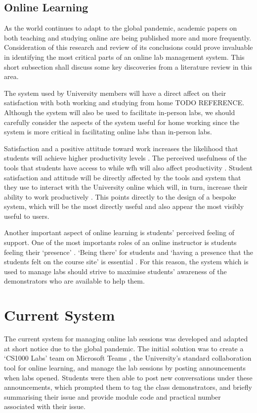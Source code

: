 \subsection{Online Learning}

As the world continues to adapt to the global pandemic, academic papers on both teaching and studying online are being published more and more frequently. Consideration of this research and review of its conclusions could prove invaluable in identifying the most critical parts of an online lab management system. This short subsection shall discuss some key discoveries from a literature review in this area.

The system used by University members will have a direct affect on their satisfaction with both working and studying from home TODO REFERENCE. Although the system will also be used to facilitate in-person labs, we should carefully consider the aspects of the system useful for home working since the system is more critical in facilitating online labs than in-person labs. 

Satisfaction and a positive attitude toward work increases the likelihood that students will achieve higher productivity levels \cite{tenney}. The perceived usefulness of the tools that students have access to while \gls{wfh} will also affect productivity \cite{venka}. Student satisfaction and attitude will be directly affected by the tools and system that they use to interact with the University online which will, in turn, increase their ability to work productively \cite{safaa}. This points directly to the design of a bespoke system, which will be the most directly useful and also appear the most visibly useful to users.

Another important aspect of online learning is students' perceived feeling of support. One of the most importants roles of an online instructor is students feeling their `presence’ \cite{martinteams}. `Being there’ for students and `having a presence that the students felt on the course site’ is essential \cite{martin}. For this reason, the system which is used to manage labs should strive to maximise students' awareness of the demonstrators who are available to help them. 

\section{Current System}

The current system for managing online lab sessions was developed and adapted at short notice due to the global pandemic. The initial solution was to create a `CS1000 Labs' team on Microsoft Teams \cite{teams}, the University's standard collaboration tool for online learning, and manage the lab sessions by posting announcements when labs opened. Students were then able to post new conversations under these announcements, which prompted them to tag the class demonstrators, and briefly summarising their issue and provide module code and practical number associated with their issue.

